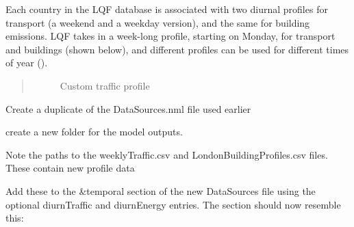 \documentclass[letterpaper,10pt,english]{sphinxmanual}
\begin{document}
Each country in the LQF database is associated with two diurnal profiles
for transport (a weekend and a weekday version), and the same for
building emissions. LQF takes in a week-long profile, starting on
Monday, for transport and buildings (shown below), and different
profiles can be used for different times of year ().
\begin{quote}

\begin{figure}[htbp]
\centering
\capstart

\noindent{}
\caption{Custom traffic profile}\label{\detokenize{Tutorials/LQF:id10}}\end{figure}
\end{quote}

\begin{figure}[htbp]
\centering
\capstart

\noindent{}
\caption{}\label{\detokenize{Tutorials/LQF:id11}}\end{figure}

Create a duplicate of the DataSources.nml file used earlier

 create a new folder for the model outputs.

 Note the paths to the weeklyTraffic.csv and
LondonBuildingProfiles.csv files. These contain new profile data

 Add these to the \&temporal section of the new DataSources
file using the optional diurnTraffic and diurnEnergy entries. The
section should now resemble this:

%
\begin{sphinxVerbatim}[commandchars=\\\{\}]
      
      
      
\end{sphinxVerbatim}
\end{document}
